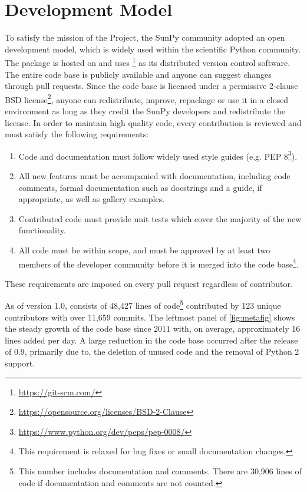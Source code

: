\section{Development Model}
\label{sec:development}

To satisfy the mission of the Project, the SunPy community adopted an open development model, which is widely used within the scientific Python community.
The \sunpypkg package is hosted on \github and uses \footnote{\url{https://git-scm.com/}} as its distributed version control software.
The entire code base is publicly available and anyone can suggest changes through pull requests.
Since the code base is licensed under a permissive 2-clause BSD license\footnote{\url{https://opensource.org/licenses/BSD-2-Clause}}, anyone can redistribute, improve, repackage or use it in a closed environment as long as they credit the SunPy developers and redistribute the license.
In order to maintain high quality code, every contribution is reviewed and must satisfy the following requirements:
\begin{enumerate}
    \item Code and documentation must follow widely used style guides (e.g. PEP 8\footnote{\url{https://www.python.org/dev/peps/pep-0008/}}).
    \item All new features must be accompanied with documentation, including code comments, formal documentation such as \python docstrings and a guide, if appropriate, as well as gallery examples.
    \item Contributed code must provide unit tests which cover the majority of the new functionality.
    \item All code must be within scope, and must be approved by at least two members of the developer community before it is merged into the code base\footnote{This requirement is relaxed for bug fixes or small documentation changes.}.
\end{enumerate}
These requirements are imposed on every pull request regardless of contributor.

As of version 1.0, \sunpypkg consists of 48,427 lines of code\footnote{This number includes documentation and comments.
There are 30,906 lines of code if documentation and comments are not counted.} contributed by 123 unique contributors with over 11,659 commits.
The leftmost panel of \autoref{fig:metafig} shows the steady growth of the code base since 2011 with, on average, approximately 16 lines added per day.
A large reduction in the code base occurred after the release of 0.9, primarily due to, the deletion of unused code and the removal of Python 2 support.

